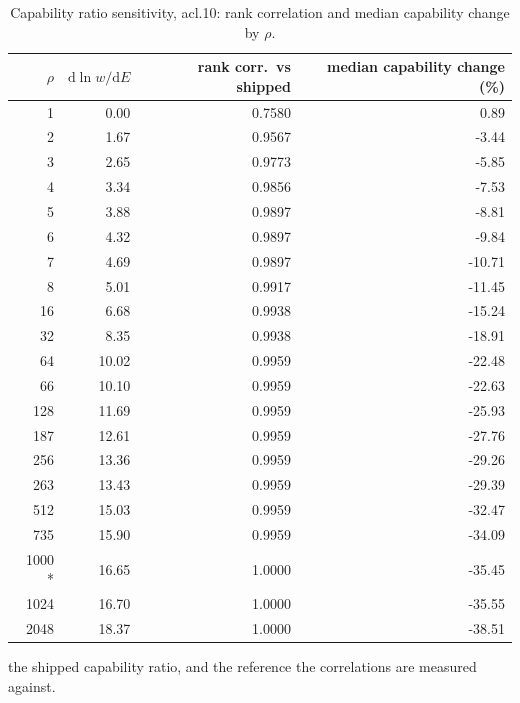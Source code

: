 \begin{table}[htbp]
  \centering
  \caption{Capability ratio sensitivity, acl.10: rank correlation and median capability change by $\rho$.}
  \label{tab:rho-acl-10-summary}
  \begin{tabular}{r r r r}
    \toprule
    $\rho$ & $\mathrm{d}\ln w/\mathrm{d}E$ & rank corr.\ vs shipped & median capability change (\%) \\
    \midrule
    1 & 0.00 & 0.7580 & 0.89 \\
    2 & 1.67 & 0.9567 & -3.44 \\
    3 & 2.65 & 0.9773 & -5.85 \\
    4 & 3.34 & 0.9856 & -7.53 \\
    5 & 3.88 & 0.9897 & -8.81 \\
    6 & 4.32 & 0.9897 & -9.84 \\
    7 & 4.69 & 0.9897 & -10.71 \\
    8 & 5.01 & 0.9917 & -11.45 \\
    16 & 6.68 & 0.9938 & -15.24 \\
    32 & 8.35 & 0.9938 & -18.91 \\
    64 & 10.02 & 0.9959 & -22.48 \\
    66 & 10.10 & 0.9959 & -22.63 \\
    128 & 11.69 & 0.9959 & -25.93 \\
    187 & 12.61 & 0.9959 & -27.76 \\
    256 & 13.36 & 0.9959 & -29.26 \\
    263 & 13.43 & 0.9959 & -29.39 \\
    512 & 15.03 & 0.9959 & -32.47 \\
    735 & 15.90 & 0.9959 & -34.09 \\
    1000 * & 16.65 & 1.0000 & -35.45 \\
    1024 & 16.70 & 1.0000 & -35.55 \\
    2048 & 18.37 & 1.0000 & -38.51 \\
    \bottomrule
  \end{tabular}
  \par\smallskip\footnotesize * the shipped capability ratio, and the reference the correlations are measured against.
\end{table}
